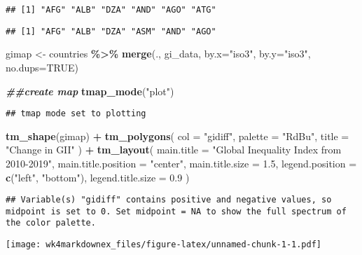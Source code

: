 \documentclass[
]{article}
\newenvironment{Shaded}{\begin{snugshade}}{\end{snugshade}}
\newcommand{\AttributeTok}[1]{\textcolor[rgb]{0.13,0.29,0.53}{#1}}
\newcommand{\ConstantTok}[1]{\textcolor[rgb]{0.56,0.35,0.01}{#1}}
\newcommand{\DocumentationTok}[1]{\textcolor[rgb]{0.56,0.35,0.01}{\textbf{\textit{#1}}}}
\newcommand{\FloatTok}[1]{\textcolor[rgb]{0.00,0.00,0.81}{#1}}
\newcommand{\FunctionTok}[1]{\textcolor[rgb]{0.13,0.29,0.53}{\textbf{#1}}}
\newcommand{\NormalTok}[1]{#1}
\newcommand{\OtherTok}[1]{\textcolor[rgb]{0.56,0.35,0.01}{#1}}
\newcommand{\SpecialCharTok}[1]{\textcolor[rgb]{0.81,0.36,0.00}{\textbf{#1}}}
\newcommand{\StringTok}[1]{\textcolor[rgb]{0.31,0.60,0.02}{#1}}
\begin{document}
\begin{Shaded}
\end{Shaded}

\begin{verbatim}
## [1] "AFG" "ALB" "DZA" "AND" "AGO" "ATG"
\end{verbatim}

\begin{Shaded}
\end{Shaded}

\begin{verbatim}
## [1] "AFG" "ALB" "DZA" "ASM" "AND" "AGO"
\end{verbatim}

\begin{Shaded}
\begin{Highlighting}[]
\NormalTok{gimap }\OtherTok{\textless{}{-}}\NormalTok{ countries }\SpecialCharTok{\%\textgreater{}\%}
  \FunctionTok{merge}\NormalTok{(.,}
\NormalTok{        gi\_data,}
        \AttributeTok{by.x=}\StringTok{"iso3"}\NormalTok{,}
        \AttributeTok{by.y=}\StringTok{"iso3"}\NormalTok{,}
        \AttributeTok{no.dups=}\ConstantTok{TRUE}\NormalTok{) }

\DocumentationTok{\#\#create map}
\FunctionTok{tmap\_mode}\NormalTok{(}\StringTok{"plot"}\NormalTok{)}
\end{Highlighting}
\end{Shaded}

\begin{verbatim}
## tmap mode set to plotting
\end{verbatim}

\begin{Shaded}
\begin{Highlighting}[]
\FunctionTok{tm\_shape}\NormalTok{(gimap) }\SpecialCharTok{+}
  \FunctionTok{tm\_polygons}\NormalTok{(}
    \AttributeTok{col =} \StringTok{"gidiff"}\NormalTok{,         }
    \AttributeTok{palette =} \StringTok{"RdBu"}\NormalTok{,         }
    \AttributeTok{title =} \StringTok{"Change in GII"}    
\NormalTok{  ) }\SpecialCharTok{+}
  \FunctionTok{tm\_layout}\NormalTok{(}
    \AttributeTok{main.title =} \StringTok{"Global Inequality Index from 2010{-}2019"}\NormalTok{,}
    \AttributeTok{main.title.position =} \StringTok{"center"}\NormalTok{,}
    \AttributeTok{main.title.size =} \FloatTok{1.5}\NormalTok{,}
    \AttributeTok{legend.position =} \FunctionTok{c}\NormalTok{(}\StringTok{"left"}\NormalTok{, }\StringTok{"bottom"}\NormalTok{),}
    \AttributeTok{legend.title.size =} \FloatTok{0.9}                
\NormalTok{  )}
\end{Highlighting}
\end{Shaded}

\begin{verbatim}
## Variable(s) "gidiff" contains positive and negative values, so midpoint is set to 0. Set midpoint = NA to show the full spectrum of the color palette.
\end{verbatim}

\texttt{[image: wk4markdownex\_files/figure-latex/unnamed-chunk-1-1.pdf]}
\end{document}

